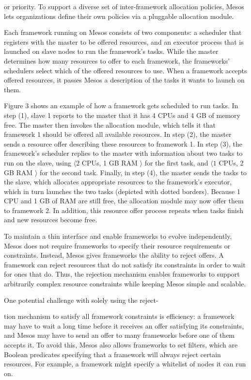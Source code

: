 \documentclass[
]{article}
\begin{document}
or priority. To support a diverse set of inter-framework allocation
policies, Mesos lets organizations define their own policies via a
pluggable allocation module.

Each framework running on Mesos consists of two components: a scheduler
that registers with the master to be offered resources, and an executor
process that is launched on slave nodes to run the framework's tasks.
While the master determines how many resources to offer to each
framework, the frameworks' schedulers select which of the offered
resources to use. When a framework accepts offered resources, it passes
Mesos a description of the tasks it wants to launch on them.

Figure 3 shows an example of how a framework gets scheduled to run
tasks. In step (1), slave 1 reports to the master that it has 4 CPUs and
4 GB of memory free. The master then invokes the allocation module,
which tells it that framework 1 should be offered all available
resources. In step (2), the master sends a resource offer describing
these resources to framework 1. In step (3), the framework's scheduler
replies to the master with information about two tasks to run on the
slave, using \(\langle2\) CPUs, 1 GB RAM \(\rangle\) for the first task,
and \(\langle1\) CPUs, 2 GB RAM \(\rangle\) for the second task.
Finally, in step (4), the master sends the tasks to the slave, which
allocates appropriate resources to the framework's executor, which in
turn launches the two tasks (depicted with dotted borders). Because 1
CPU and 1 GB of RAM are still free, the allocation module may now offer
them to framework 2. In addition, this resource offer process repeats
when tasks finish and new resources become free.

To maintain a thin interface and enable frameworks to evolve
independently, Mesos does not require frameworks to specify their
resource requirements or constraints. Instead, Mesos gives frameworks
the ability to reject offers. A framework can reject resources that do
not satisfy its constraints in order to wait for ones that do. Thus, the
rejection mechanism enables frameworks to support arbitrarily complex
resource constraints while keeping Mesos simple and scalable.

One potential challenge with solely using the reject-

tion mechanism to satisfy all framework constraints is efficiency: a
framework may have to wait a long time before it receives an offer
satisfying its constraints, and Mesos may have to send an offer to many
frameworks before one of them accepts it. To avoid this, Mesos also
allows frameworks to set filters, which are Boolean predicates
specifying that a framework will always reject certain resources. For
example, a framework might specify a whitelist of nodes it can run on.
\end{document}
